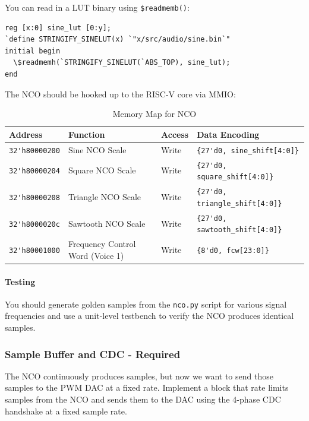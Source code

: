 \documentclass[11pt]{article}
\begin{document}
You can read in a LUT binary using \verb|$readmemb()|:
\begin{verbatim}
reg [x:0] sine_lut [0:y];
`define STRINGIFY_SINELUT(x) `"x/src/audio/sine.bin`"
initial begin
  \$readmemh(`STRINGIFY_SINELUT(`ABS_TOP), sine_lut);
end
\end{verbatim}

The NCO should be hooked up to the RISC-V core via MMIO:
\begin{table}[hbt]
  \begin{center}
    \caption{Memory Map for NCO}
    \label{mem_map2}
    \begin{tabular}{l l l l}
      \toprule
      \textbf{Address} & \textbf{Function} & \textbf{Access} & \textbf{Data Encoding}\\
      \midrule
      \verb|32'h80000200| & Sine NCO Scale & Write & \verb|{27'd0, sine_shift[4:0]}| \\
      \verb|32'h80000204| & Square NCO Scale & Write & \verb|{27'd0, square_shift[4:0]}| \\
      \verb|32'h80000208| & Triangle NCO Scale & Write & \verb|{27'd0, triangle_shift[4:0]}| \\
      \verb|32'h8000020c| & Sawtooth NCO Scale & Write & \verb|{27'd0, sawtooth_shift[4:0]}| \\
      \midrule
      \verb|32'h80001000| & Frequency Control Word (Voice 1) & Write & \verb|{8'd0, fcw[23:0]}| \\
      \midrule
    \end{tabular}
  \end{center}
\end{table}

\paragraph{Testing}
You should generate golden samples from the \verb|nco.py| script for various signal frequencies and use a unit-level testbench to verify the NCO produces identical samples.

\subsubsection{Sample Buffer and CDC - Required}
The NCO continuously produces samples, but now we want to send those samples to the PWM DAC at a fixed rate.
Implement a block that rate limits samples from the NCO and sends them to the DAC using the 4-phase CDC handshake at a fixed sample rate.
\end{document}
